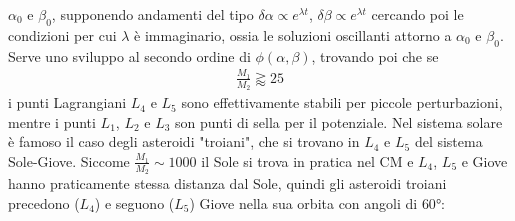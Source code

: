 \documentclass[a4paper, oneside]{book}
\begin{document}
$\alpha_0$ e $\beta_0$, supponendo andamenti del tipo $\delta\alpha \propto e^{\lambda t}$, $\delta \beta \propto e^{\lambda t}$ cercando 
poi le condizioni per cui $\lambda$ è immaginario, ossia le soluzioni 
oscillanti attorno a $\alpha_0$ e $\beta_0$. Serve uno sviluppo al secondo ordine
di $\phi(\alpha, \beta)$, trovando poi che se
\begin{gather*}
    \frac{M_1}{M_2} \gtrapprox 25
\end{gather*}
i punti Lagrangiani $L_4$ e $L_5$ sono effettivamente stabili per piccole perturbazioni, 
mentre i punti $L_1$, $L_2$ e $L_3$ son punti di sella per il potenziale. 
Nel sistema solare è famoso il caso degli asteroidi "troiani", che si trovano 
in $L_4$ e $L_5$ del sistema Sole-Giove. Siccome $\frac{M_1}{M_2} \sim 1000$ il Sole si trova in pratica 
nel CM e $L_4$, $L_5$ e Giove hanno praticamente stessa distanza dal Sole, quindi gli asteroidi troiani precedono ($L_4$)
e seguono ($L_5$) Giove nella sua orbita con angoli di $60$°:
\end{document}
